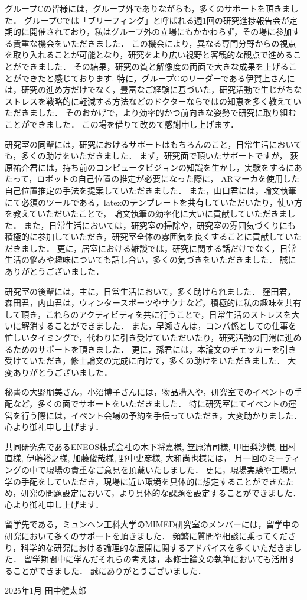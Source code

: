 \documentclass[../main]{subfiles}
\begin{document}
グループCの皆様には，グループ外でありながらも，多くのサポートを頂きました．
グループCでは「ブリーフィング」と呼ばれる週1回の研究進捗報告会が定期的に開催されており，私はグループ外の立場にもかかわらず，その場に参加する貴重な機会をいただきました．
この機会により，異なる専門分野からの視点を取り入れることが可能となり，研究をより広い視野と客観的な観点で進めることができました．
その結果，研究の質と解像度の両面で大きな成果を上げることができたと感じております.
特に，グループCのリーダーである伊賀上さんには，研究の進め方だけでなく，豊富なご経験に基づいた，研究活動で生じがちなストレスを戦略的に軽減する方法などのドクターならではの知恵を多く教えていただきました．
そのおかげで，より効率的かつ前向きな姿勢で研究に取り組むことができました．
この場を借りて改めて感謝申し上げます．

研究室の同輩には，研究におけるサポートはもちろんのこと，日常生活においても，多くの助けをいただきました．
まず，研究面で頂いたサポートですが，
荻原祐介君には，持ち前のコンピュータビジョンの知識を生かし，実験をするにあたって，ロボットの自己位置の推定が必要になった際に，
ARマーカを使用した自己位置推定の手法を提案していただきました．
また，山口君には，論文執筆にて必須のツールである，latexのテンプレートを共有していただいたり，使い方を教えていただいたことで，
論文執筆の効率化に大いに貢献していただきました．
また，日常生活においては，研究室の掃除や，研究室の雰囲気づくりにも積極的に参加していただき，研究室全体の雰囲気を良くすることに貢献していただきました．
更に，居室における雑談では，研究に関する話だけでなく，日常生活の悩みや趣味についても話し合い，多くの気づきをいただきました．
誠にありがとうございました．

研究室の後輩には，主に，日常生活において，多く助けられました．
窪田君，森田君，内山君は，ウィンタースポーツやサウナなど，積極的に私の趣味を共有して頂き，これらのアクティビティを共に行うことで，日常生活のストレスを大いに解消することができました．
また，早瀬さんは，コンパ係としての仕事を忙しいタイミングで，代わりに引き受けていただいたり，研究活動の円滑に進めるためのサポートを頂きました．
更に，孫君には，本論文のチェッカーを引き受けていただき，修士論文の完成に向けて，多くの助けをいただきました．
大変ありがとうございました．


秘書の大野朋美さん，小沼博子さんには，物品購入や，研究室でのイベントの手配など，多くの面でサポートをいただきました．
特に研究室にてイベントの運営を行う際には，イベント会場の予約を手伝っていただき，大変助かりました．
心より御礼申し上げます．

共同研究先であるENEOS株式会社の木下将嘉様, 笠原清司様, 甲田梨沙様, 田村直様, 伊藤裕之様, 加藤俊哉様, 野中史彦様, 大和尚也様には，
月一回のミーティングの中で現場の貴重なご意見を頂戴いたしました．
更に，現場実験や工場見学の手配をしていただき，現場に近い環境を具体的に想定することができたため，研究の問題設定において，より具体的な課題を設定することができました．
心より御礼申し上げます．

留学先である，ミュンヘン工科大学のMIMED研究室のメンバーには，留学中の研究において多くのサポートを頂きました．
頻繁に質問や相談に乗ってくださり，科学的な研究における論理的な展開に関するアドバイスを多くいただきました．
留学期間中に学んだそれらの考えは，本修士論文の執筆においても活用することができました．
誠にありがとうございました．

\begin{flushright}
  2025年1月 田中健太郎
\end{flushright}
\end{document}
